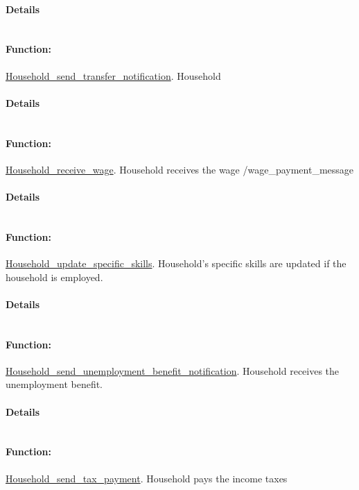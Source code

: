 \documentclass[a4paper,11pt]{article}
\begin{document}
\paragraph{Details}
\begin{verbatim}
\end{verbatim}
\paragraph{Function:}\url{Household_send_transfer_notification}.
Household 
\paragraph{Details}
\begin{verbatim}
\end{verbatim}
\paragraph{Function:}\url{Household_receive_wage}.
Household receives the wage /wage\_payment\_message
\paragraph{Details}
\begin{verbatim}
\end{verbatim}
\paragraph{Function:}\url{Household_update_specific_skills}.
Household's specific skills are updated if the household is employed.
\paragraph{Details}
\begin{verbatim}
\end{verbatim}
\paragraph{Function:}\url{Household_send_unemployment_benefit_notification}.
Household receives the unemployment benefit.
\paragraph{Details}
\begin{verbatim}
\end{verbatim}
\paragraph{Function:}\url{Household_send_tax_payment}.
Household pays the income taxes
\end{document}
